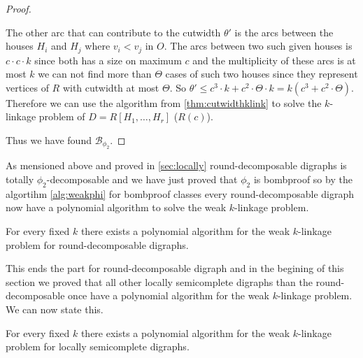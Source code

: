 \begin{proof}
\begin{itemize}
        The other arc that can contribute to the cutwidth $\theta'$ is the arcs between the houses $H_i$ and $H_j$ where $v_i<v_j$ in $O$. 
        The arcs between two such given houses is $c\cdot c\cdot k$ since both has a size on maximum $c$ and the multiplicity of these arcs is at most $k$ we can not find more than $\Theta$ cases of such two houses since they represent vertices of $R$ with cutwidth at most $\Theta$.
        So $\theta'\leq c^3\cdot k+c^2\cdot \Theta \cdot k=k(c^3+c^2\cdot \Theta)$.
        Therefore we can use the algorithm from \autoref{thm:cutwidthklink} to solve the $k$-linkage problem of $D=R[H_1,\dots ,H_r]$ ($R(c)$).
    \end{itemize}
    Thus we have found $\mathcal{B}_{\phi_2}$.
\end{proof}
As mensioned above and proved in \autoref{sec:locally} round-decomposable digraphs is totally $\phi_2$-decomposable and we have just proved that $\phi_2$ is bombproof so by the algortihm \autoref{alg:weakphi} for bombproof classes every round-decomposable digraph now have a polynomial algorithm to solve the weak $k$-linkage problem.
\begin{thm}
    For every fixed $k$ there exists a polynomial algorithm for the weak $k$-linkage problem for round-decomposable digraphs.
\end{thm}
This ends the part for round-decomposable digraph and in the begining of this section we proved that all other locally semicomplete digraphs than the round-decomposable once have a polynomial algorithm for the weak $k$-linkage problem. We can now state this.
\begin{thm}
    For every fixed $k$ there exists a polynomial algorithm for the weak $k$-linkage problem for locally semicomplete digraphs.
\end{thm}